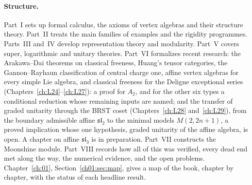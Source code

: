 \paragraph{Structure.} Part~I sets up formal calculus, the axioms of vertex algebras and their
structure theory. Part~II treats the main families of examples and the rigidity programmes.
Parts~III and~IV develop representation theory and modularity. Part~V covers super, logarithmic and
unitary theories. Part~VI formalizes recent research: the Arakawa--Dai theorems on classical freeness,
Huang's tensor categories, the Gannon--Rayhaun classification of central charge one, affine vertex
algebras for every simple Lie algebra, and classical freeness for the Deligne exceptional series
(Chapters~\ref{ch:L24}--\ref{ch:L27}): a proof for $A_2$, and for the other six types a conditional
reduction whose remaining inputs are named; and the transfer of graded unitarity through the BRST coset
(Chapters~\ref{ch:L28} and~\ref{ch:L29}), from the boundary admissible affine $\mathfrak{sl}_2$ to the minimal models
$M(2,2n+1)$, a proved implication whose one hypothesis, graded unitarity of the affine algebra, is open. A chapter on
affine $\mathfrak{sl}_3$ is in preparation. Part~VII constructs the Moonshine module. Part~VIII records how all of this was
verified, every dead end met along the way, the numerical evidence, and the open problems. Chapter~\ref{ch:01},
Section~\ref{ch01:sec:map}, gives a map of the book, chapter by chapter, with the status of each headline result.
